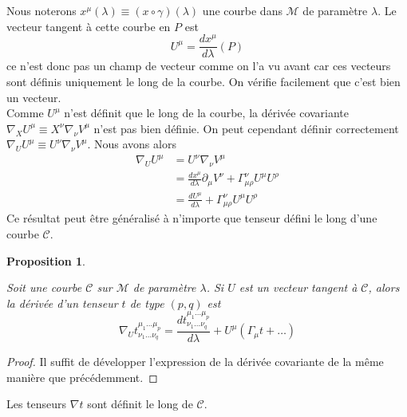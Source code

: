 \documentclass[a4paper,11pt]{report}
\theoremstyle{definition}
\theoremstyle{plain}
\newtheorem{prop}[thm]{Proposition}
\theoremstyle{definition}
\theoremstyle{remark}
\newcommand{\M}{\mathscr{M}}
\newcommand{\p}{\partial}
\begin{document}
            Nous noterons $x^\mu(\lambda)\equiv (x\circ \gamma)(\lambda)$ une courbe dans $\M$ de paramètre $\lambda$. Le vecteur tangent à cette courbe en $P$ est
                \begin{equation}
                    U^\mu = \frac{dx^\mu}{d\lambda}(P)
                \end{equation}
            ce n'est donc pas un champ de vecteur comme on l'a vu avant car ces vecteurs sont définis uniquement le long de la courbe. On vérifie facilement que c'est bien un vecteur.\\
            
            Comme $U^\mu$ n'est définit que le long de la courbe, la dérivée covariante $\nabla_X U^\mu\equiv X^\nu\nabla_\nu V^\mu$ n'est pas bien définie. On peut cependant définir correctement $\nabla_U U^\mu\equiv U^\nu\nabla_\nu V^\mu$. Nous avons alors
            \begin{align}
                \nabla_U U^\mu &= U^\nu\nabla_\nu V^\mu \\
                &= \frac{dx^\mu}{d\lambda}\p_\mu V^\nu + \Gamma^\nu_{\mu\rho}U^\mu U^\rho \\
                &= \frac{dU^\mu}{d\lambda} + \Gamma^\nu_{\mu\rho} U^\mu U^\rho
            \end{align}
            Ce résultat peut être généralisé à n'importe que tenseur défini le long d'une courbe $\mathscr{C}$.
            \begin{prop}\begin{leftbar}
                Soit une courbe $\mathscr{C}$ sur $\M$ de paramètre $\lambda$. Si $U$ est un vecteur tangent à $\mathscr{C}$, alors la dérivée d'un tenseur $t$ de type $(p,q)$ est
                \begin{equation}
                    \nabla_U t^{\mu_1\dots\mu_p}_{\nu_1\dots\nu_q} = \frac{dt^{\mu_1\dots\mu_p}_{\nu_1\dots\nu_q}}{d\lambda} + U^\mu(\Gamma_\mu t + \dots)
                \end{equation}
            \end{leftbar}\end{prop}
            
            \begin{proof}
                Il suffit de développer l'expression de la dérivée covariante de la même manière que précédemment.
            \end{proof}
            
            Les tenseurs $\nabla t$ sont définit le long de $\mathscr{C}$.\\
            
\end{document}
